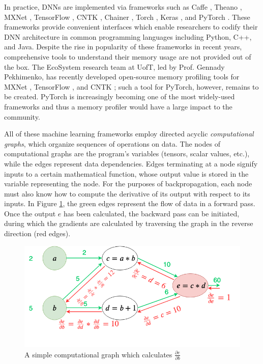 \documentclass[12pt,letterpaper]{article}
\begin{document}
\label{sec:Machine_Learning_Frameworks_and_Memory_Profiler}
In practice, DNNs are implemented via frameworks such as  Caffe \cite{caffe}, Theano \cite{theano}, MXNet \cite{mxnet_paper}, TensorFlow \cite{tensorflow}, CNTK \cite{cntk}, Chainer \cite{chainer}, Torch \cite{torch}, Keras \cite{keras}, and PyTorch \cite{pytorch_paper}. These frameworks provide convenient interfaces which enable researchers to codify their DNN architecture in common programming languages including Python, C++, and Java. Despite the rise in popularity of these frameworks in recent years, comprehensive tools to understand their memory usage are not provided out of the box. The EcoSystem research team at UofT, led by Prof. Gennady Pekhimenko, has recently developed open-source memory profiling tools for MXNet \cite{mxnet_paper}, TensorFlow \cite{tensorflow}, and CNTK \cite{cntk}; such a tool for PyTorch, however, remains to be created. PyTorch is increasingly becoming one of the most widely-used frameworks and thus a memory profiler would have a large impact to the community.
\par

All of these machine learning frameworks employ directed acyclic \textit{computational graphs}, which organize sequences of operations on data. The nodes of computational graphs are the program's variables (tensors, scalar values, etc.), while the edges represent data dependencies. Edges terminating at a node signify inputs to a certain mathematical function, whose output value is stored in the variable representing the node. For the purposes of backpropagation, each node must also know how to compute the derivative of its output with respect to its inputs. In Figure \ref{fig:computational_graph}, the green edges represent the flow of data in a forward pass. Once the output $e$ has been calculated, the backward pass can be initiated, during which the gradients are calculated by traversing the graph in the reverse direction (red edges).
\par 

\begin{figure}[ht]
\centering
\includegraphics[width=.7\textwidth]{computational_graph_example.png}
\captionsetup{width=0.7\linewidth}
\caption{A simple computational graph \cite{computational_graph_example} which calculates $\frac{\partial e}{\partial b}$}
\label{fig:computational_graph}
\end{figure}
\end{document}
